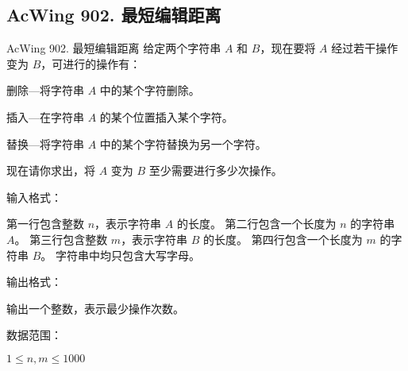\subsection{AcWing 902. 最短编辑距离}
\begin{titledbox}{AcWing 902. 最短编辑距离}
    给定两个字符串 $A$ 和 $B$，现在要将 $A$ 经过若干操作变为 $B$，可进行的操作有：
    \begin{myenum}
        \item 删除---将字符串 $A$ 中的某个字符删除。
        \item 插入---在字符串 $A$ 的某个位置插入某个字符。
        \item 替换---将字符串 $A$ 中的某个字符替换为另一个字符。
    \end{myenum}
    现在请你求出，将 $A$ 变为 $B$ 至少需要进行多少次操作。

    输入格式：

    第一行包含整数 $n$，表示字符串 $A$ 的长度。 第二行包含一个长度为 $n$ 的字符串 $A$。 第三行包含整数 $m$，表示字符串 $B$ 的长度。 第四行包含一个长度为 $m$ 的字符串 $B$。 字符串中均只包含大写字母。

    输出格式：

    输出一个整数，表示最少操作次数。

    数据范围：

    $1 \le n, m \le 1000$

    \begin{inputblock}
         \\
         \\
         \\
    \end{inputblock}
    \begin{outputblock}
    \end{outputblock}
\end{titledbox}

